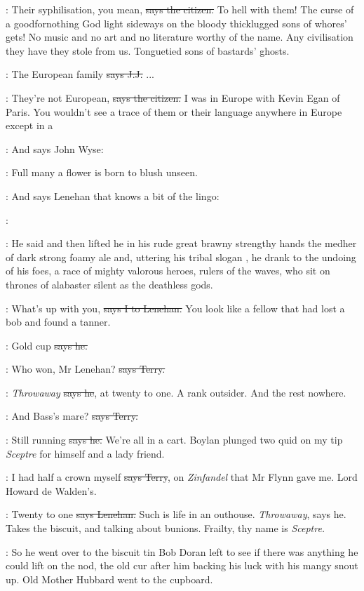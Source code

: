 \citizen:
Their syphilisation,
you mean,
\sout{says the citizen.}
To hell with them!
The
curse of a goodfornothing God light sideways on the bloody thicklugged
sons of whores' gets!
No music and no art and no literature worthy of the
name.
Any civilisation they have they stole from us.
Tonguetied sons of
bastards' ghosts.

\jjom:
The European family
\sout{says J.J.} ...

\citizen:
They're not European,
\sout{says the citizen.}
I was in Europe with Kevin Egan
of Paris.
You wouldn't see a trace of them or their language anywhere in
Europe except in a 

\Nq:
And says John Wyse:

\johnwyse:
Full many a flower is born to blush unseen.

\Nq:
And says Lenehan that knows a bit of the lingo:

\lenehan:

:
He said and then lifted he
in his rude great brawny strengthy hands
the medher of dark strong foamy ale and,
uttering his tribal slogan ,
he drank to the undoing of his foes,
a race of mighty valorous
heroes,
rulers of the waves,
who sit on thrones of alabaster silent as the
deathless gods.

:
What's up with you,
\sout{says I to Lenehan.}
You look like a fellow that had
lost a bob and found a tanner.

\lenehan:
Gold cup
\sout{says he.}

\terry:
Who won,
Mr Lenehan?
\sout{says Terry.}

\lenehan:
\emph{Throwaway}
\sout{says he},
at twenty to one.
A rank outsider.
And the rest
nowhere.%

\terry:
And Bass's mare?
\sout{says Terry.}

\lenehan:
Still running
\sout{says he.}
We're all in a cart.
Boylan plunged two quid on
my tip \emph{Sceptre} for himself and a lady friend.

\terry:
I had half a crown myself
\sout{says Terry},
on \emph{Zinfandel} that Mr Flynn gave
me.
Lord Howard de Walden's.

\lenehan:
Twenty to one
\sout{says Lenehan.}
Such is life in an outhouse.
\emph{Throwaway},
says he.
Takes the biscuit,
and talking about bunions.
Frailty,
thy name is \emph{Sceptre.}

\Nq:
So he went over to the biscuit tin Bob Doran left to see if there was
anything he could lift on the nod,
the old cur after him backing his luck
with his mangy snout up.
Old Mother Hubbard went to the cupboard.

